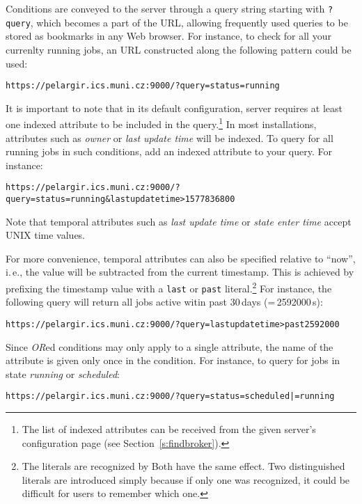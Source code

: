 Conditions are conveyed to the \LB server through a query string starting with \texttt{?query}, which becomes a part of the URL, allowing frequently used queries to be stored as bookmarks in any Web browser. For instance, to check for all your currenlty running jobs, an URL constructed along the following pattern could be used:

\begin{verbatim}
https://pelargir.ics.muni.cz:9000/?query=status=running
\end{verbatim}

It is important to note that in its default configuration, \LB server requires at least one indexed attribute to be included in the query.\footnote{The list of indexed attributes can be received from the given \LB server's configuration page (see Section~\ref{s:findbroker}).} In most installations, attributes such as \emph{owner} or \emph{last update time} will be indexed. To query for all running jobs in such conditions, add an indexed attribute to your query. For instance:

\begin{verbatim}
https://pelargir.ics.muni.cz:9000/?query=status=running&lastupdatetime>1577836800
\end{verbatim}

Note that temporal attributes such as \emph{last update time} or \emph{state enter time} accept UNIX time values.

For more convenience, temporal attributes can also be specified relative to ``now'', i.\,e., the value will be subtracted from the current timestamp. This is achieved by prefixing the timestamp value with a \texttt{last} or \texttt{past} literal.\footnote{The literals are recognized by 
Both have the same effect. Two distinguished literals are introduced simply because if only one was recognized, it could be difficult for users to remember which one.} For instance, the following query will return all jobs active witin past 30\,days (=\,2592000\,s):

\begin{verbatim}
https://pelargir.ics.muni.cz:9000/?query=lastupdatetime>past2592000
\end{verbatim}

Since \emph{OR}ed conditions may only apply to a single attribute, the name of the attribute is given only once in the condition. For instance, to query for jobs in state \emph{running} or \emph{scheduled}:

\begin{verbatim}
https://pelargir.ics.muni.cz:9000/?query=status=scheduled|=running
\end{verbatim}

